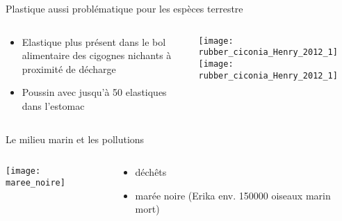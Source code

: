 \documentclass[10pt]{beamer}
\begin{document}
\begin{frame}{Plastique aussi problématique pour les espèces terrestre}
 \begin{columns}[c]
    \begin{column}[c]{0.5\textwidth}
     \begin{itemize}
      \item Elastique plus présent dans le bol alimentaire des cigognes nichants à proximité de décharge
      \item Poussin avec jusqu'à 50 elastiques dans l'estomac
      \end{itemize}
    \end{column}
    \begin{column}[c]{0.5\textwidth}
   \begin{center}
  
     \texttt{[image: rubber\_ciconia\_Henry\_2012\_1]}
\texttt{[image: rubber\_ciconia\_Henry\_2012\_1]}
      \end{center}
    
    \end{column}
  \end{columns}
  \begin{tiny}
        \vspace{10pt}
 \cite{Henry2012}
\end{tiny}
\end{frame}

\begin{frame}{Le milieu marin et les pollutions}
 \begin{columns}[c]
    \begin{column}[c]{0.5\textwidth}
      \begin{center}
  
     \texttt{[image: maree\_noire]}
      \end{center}
    \end{column}
    \begin{column}[c]{0.5\textwidth}
      \begin{itemize}
      \item déchêts
      \item marée noire (Erika env. 150000 oiseaux marin mort)
      \end{itemize}
    \end{column}
  \end{columns}
 

\end{frame}
\end{document}
